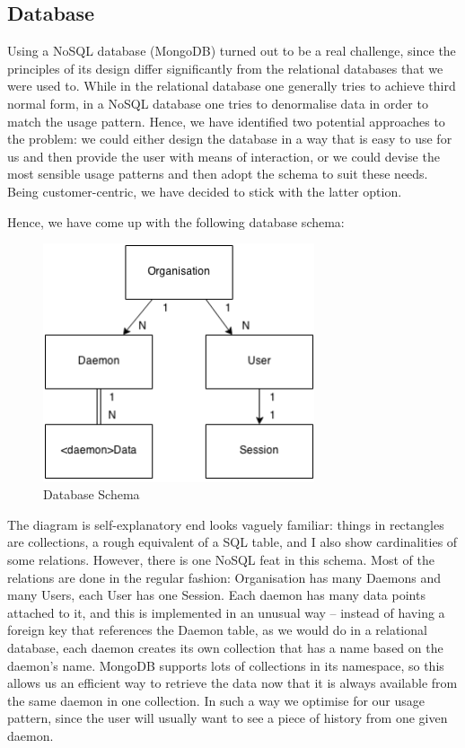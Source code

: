 \documentclass{l3proj}
\begin{document}
\subsection{Database}

Using a NoSQL database (MongoDB) turned out to be a real challenge, since the principles of its design differ significantly from the relational databases that we were used to. While in the relational database one generally tries to achieve third normal form, in a NoSQL database one tries to denormalise data in order to match the usage pattern. Hence, we have identified two potential approaches to the problem: we could either design the database in a way that is easy to use for us and then provide the user with means of interaction, or we could devise the most sensible usage patterns and then adopt the schema to suit these needs. Being customer-centric, we have decided to stick with the latter option.

Hence, we have come up with the following database schema:

\begin{figure}[H]
\centering
\includegraphics[width=80mm]{images/DatabaseSchema.png}
\caption{Database Schema}
\end{figure}

The diagram is self-explanatory end looks vaguely familiar: things in rectangles are collections, a rough equivalent of a SQL table, and I also show cardinalities of some relations. However, there is one NoSQL feat in this schema. Most of the relations are done in the regular fashion: Organisation has many Daemons and many Users, each User has one Session. Each daemon has many data points attached to it, and this is implemented in an unusual way – instead of having a foreign key that references the Daemon table, as we would do in a relational database, each daemon creates its own collection that has a name based on the daemon's name. MongoDB supports lots of collections in its namespace, so this allows us an efficient way to retrieve the data now that it is always available from the same daemon in one collection. In such a way we optimise for our usage pattern, since the user will usually want to see a piece of history from one given daemon.
\end{document}
